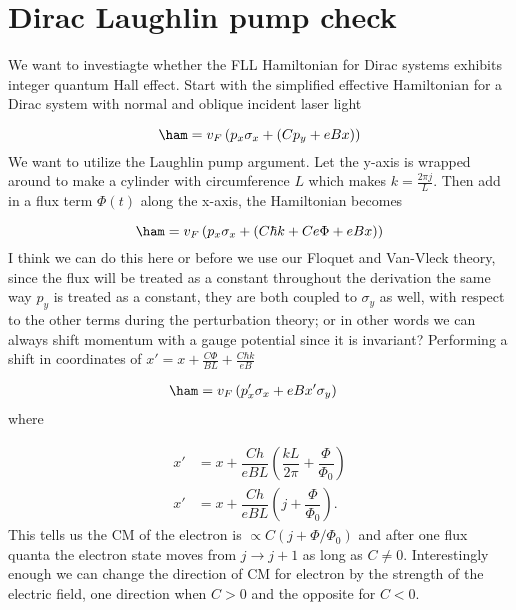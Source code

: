 \section{Dirac Laughlin pump check}

We want to investiagte whether the FLL Hamiltonian for Dirac systems exhibits integer quantum Hall effect.
Start with the simplified effective Hamiltonian for a Dirac system with normal and oblique incident laser light

\begin{equation}
  \ham = v_F \left(p_x \sigma_x + \left(Cp_y + eBx \right) \right)
\end{equation}
We want to utilize the Laughlin pump argument.
Let the y-axis is wrapped around to make a cylinder with circumference $L$ which makes $k=\tfrac{2\pi j}{L}$.
Then add in a flux term $\Phi(t)$ along the x-axis, the Hamiltonian becomes

\begin{equation}
  \ham = v_F \left( p_x \sigma_x + \left(C\hbar k + Ce\Phi + eBx \right) \right)
\end{equation}
I think we can do this here or before we use our Floquet and Van-Vleck theory, since the flux will be treated as a constant throughout the derivation the same way $p_y$ is treated as a constant, they are both coupled to $\sigma_y$ as well, with respect to the other terms during the perturbation theory; or in other words we can always shift momentum with a gauge potential since it is invariant?
Performing a shift in coordinates of $x' = x + \tfrac{C\Phi}{BL} + \tfrac{C\hbar k}{eB}$

\begin{align}
  \ham &= v_F \left( p_x' \sigma_{x} + eBx' \sigma_y \right)
\end{align}
where

\begin{align}
  x' &= x + \dfrac{Ch}{eBL} \left( \dfrac{kL}{2\pi} + \dfrac{\Phi}{\Phi_0} \right) \nonumber \\
  x' &= x + \dfrac{Ch}{eBL} \left( j + \dfrac{\Phi}{\Phi_0} \right).
\end{align}
This tells us the CM of the electron is $\propto C(j+ \Phi/\Phi_0)$ and after one flux quanta the electron state moves from $j \rightarrow j+1$ as long as $C \neq 0$. Interestingly enough we can change the direction of CM for electron by the strength of the electric field, one direction when $C>0$ and the opposite for $C<0$.
